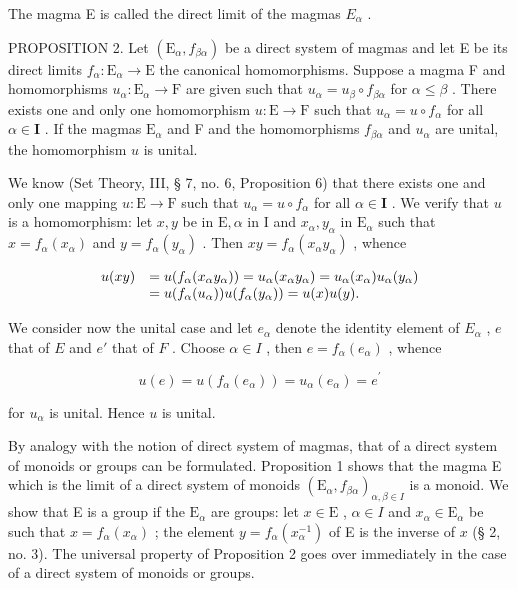 The magma E is called the direct limit of the magmas \(E_{\alpha}\) .

PROPOSITION 2. Let \((\mathrm{E}_{\alpha}, f_{\beta \alpha})\) be a direct system of magmas and let E be its direct limits \(f_{\alpha} \colon \mathrm{E}_{\alpha} \to \mathrm{E}\) the canonical homomorphisms. Suppose a magma F and homomorphisms \(u_{\alpha} \colon \mathrm{E}_{\alpha} \to \mathrm{F}\) are given such that \(u_{\alpha} = u_{\beta} \circ f_{\beta \alpha}\) for \(\alpha \leqslant \beta\) . There exists one and only one homomorphism \(u \colon \mathrm{E} \to \mathrm{F}\) such that \(u_{\alpha} = u \circ f_{\alpha}\) for all \(\alpha \in \mathbf{I}\) . If the magmas \(\mathrm{E}_{\alpha}\) and F and the homomorphisms \(f_{\beta \alpha}\) and \(u_{\alpha}\) are unital, the homomorphism \(u\) is unital.

We know (Set Theory, III, § 7, no. 6, Proposition 6) that there exists one and only one mapping \(u: \mathrm{E} \to \mathrm{F}\) such that \(u_{\alpha} = u \circ f_{\alpha}\) for all \(\alpha \in \mathbf{I}\) . We verify that \(u\) is a homomorphism: let \(x, y\) be in \(\mathrm{E}, \alpha\) in \(\mathrm{I}\) and \(x_{\alpha}, y_{\alpha}\) in \(\mathrm{E}_{\alpha}\) such that \(x = f_{\alpha}(x_{\alpha})\) and \(y = f_{\alpha}(y_{\alpha})\) . Then \(xy = f_{\alpha}(x_{\alpha}y_{\alpha})\) , whence

\[
\begin{array}{r l} u (x y) & = u (f _ {\alpha} (x _ {\alpha} y _ {\alpha})) = u _ {\alpha} (x _ {\alpha} y _ {\alpha}) = u _ {\alpha} (x _ {\alpha}) u _ {\alpha} (y _ {\alpha}) \\ & = u (f _ {\alpha} (u _ {\alpha})) u (f _ {\alpha} (y _ {\alpha})) = u (x) u (y). \end{array}
\]

We consider now the unital case and let \(e_{\alpha}\) denote the identity element of \(E_{\alpha}\) , \(e\) that of \(E\) and \(e'\) that of \(F\) . Choose \(\alpha \in I\) , then \(e = f_{\alpha}(e_{\alpha})\) , whence

\[
u (e) = u \left(f _ {\alpha} \left(e _ {\alpha}\right)\right) = u _ {\alpha} \left(e _ {\alpha}\right) = e ^ {\prime}
\]

for \(u_{\alpha}\) is unital. Hence \(u\) is unital.

By analogy with the notion of direct system of magmas, that of a direct system of monoids or groups can be formulated. Proposition 1 shows that the magma E which is the limit of a direct system of monoids \((\mathrm{E}_{\alpha}, f_{\beta \alpha})_{\alpha, \beta \in I}\) is a monoid. We show that E is a group if the \(\mathrm{E}_{\alpha}\) are groups: let \(x \in \mathrm{E}\) , \(\alpha \in I\) and \(x_{\alpha} \in \mathrm{E}_{\alpha}\) be such that \(x = f_{\alpha}(x_{\alpha})\) ; the element \(y = f_{\alpha}(x_{\alpha}^{-1})\) of E is the inverse of \(x\) (§ 2, no. 3). The universal property of Proposition 2 goes over immediately in the case of a direct system of monoids or groups.

